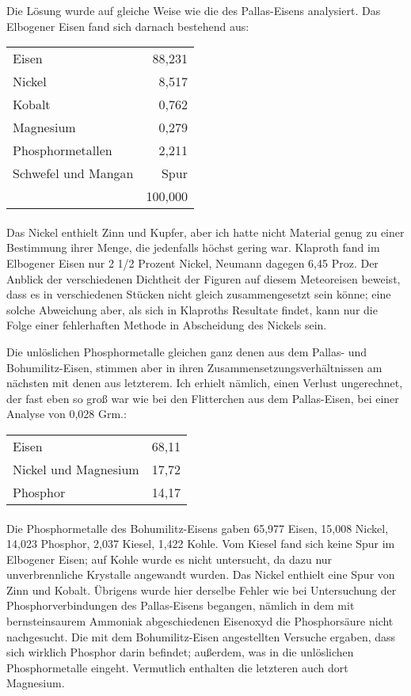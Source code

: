 \documentclass[a4paper, 11pt, oneside]{article}
\begin{document}
Die Lösung wurde auf gleiche Weise wie die des Pallas-Eisens analysiert. Das Elbogener Eisen fand sich darnach bestehend aus:
\begin{center}
\begin{tabular}{ l r }
    Eisen & 88,231\\
    Nickel & 8,517\\
    Kobalt & 0,762\\
    Magnesium & 0,279\\
    Phosphormetallen & 2,211\\
    Schwefel und Mangan & Spur\\
     & 100,000\\
\end{tabular}
\end{center}
\paragraph{}
Das Nickel enthielt Zinn und Kupfer, aber ich hatte nicht Material genug zu einer Bestimmung ihrer Menge, die jedenfalls höchst gering war. Klaproth fand im Elbogener Eisen nur 2 1/2 Prozent Nickel, Neumann dagegen 6,45 Proz. Der Anblick der verschiedenen Dichtheit der Figuren auf diesem Meteoreisen beweist, dass es in verschiedenen Stücken nicht gleich zusammengesetzt sein könne; eine solche Abweichung aber, als sich in Klaproths Resultate findet, kann nur die Folge einer fehlerhaften Methode in Abscheidung des Nickels sein.

Die unlöslichen Phosphormetalle gleichen ganz denen aus dem Pallas- und Bohumilitz-Eisen, stimmen aber in ihren Zusammensetzungsverhältnissen am nächsten mit denen aus letzterem. Ich erhielt nämlich, einen Verlust ungerechnet, der fast eben so groß war wie bei den Flitterchen aus dem Pallas-Eisen, bei einer Analyse von 0,028 Grm.:
\begin{center}
\begin{tabular}{ l r }
    Eisen & 68,11\\
    Nickel und Magnesium & 17,72\\
    Phosphor & 14,17\\
\end{tabular}
\end{center}
\paragraph{}
Die Phosphormetalle des Bohumilitz-Eisens gaben 65,977 Eisen, 15,008 Nickel, 14,023 Phosphor, 2,037 Kiesel, 1,422 Kohle. Vom Kiesel fand sich keine Spur im Elbogener Eisen; auf Kohle wurde es nicht untersucht, da dazu nur unverbrennliche Krystalle angewandt wurden. Das Nickel enthielt eine Spur von Zinn und Kobalt. Übrigens wurde hier derselbe Fehler wie bei Untersuchung der Phosphorverbindungen des Pallas-Eisens begangen, nämlich in dem mit bernsteinsaurem Ammoniak abgeschiedenen Eisenoxyd die Phosphorsäure nicht nachgesucht. Die mit dem Bohumilitz-Eisen angestellten Versuche ergaben, dass sich wirklich Phosphor darin befindet; außerdem, was in die unlöslichen Phosphormetalle eingeht. Vermutlich enthalten die letzteren auch dort Magnesium.
\end{document}
